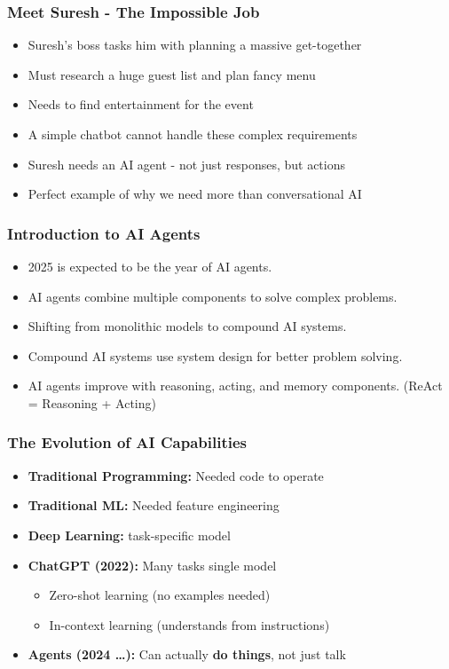 \begin{frame}[fragile]\frametitle{Meet Suresh - The Impossible Job}
      \begin{itemize}
        \item Suresh's boss tasks him with planning a massive get-together
        \item Must research a huge guest list and plan fancy menu
        \item Needs to find entertainment for the event
        \item A simple chatbot cannot handle these complex requirements
        \item Suresh needs an AI agent - not just responses, but actions
        \item Perfect example of why we need more than conversational AI
      \end{itemize}
\end{frame}


\begin{frame}[fragile]\frametitle{Introduction to AI Agents}
    \begin{itemize}
        \item 2025 is expected to be the year of AI agents.
        \item AI agents combine multiple components to solve complex problems.
        \item Shifting from monolithic models to compound AI systems.
        \item Compound AI systems use system design for better problem solving.
        \item AI agents improve with reasoning, acting, and memory components. (ReAct = Reasoning + Acting)
    \end{itemize}
\end{frame}


\begin{frame}[fragile]\frametitle{The Evolution of AI Capabilities}
\begin{itemize}
    \item \textbf{Traditional Programming:} Needed code to operate
    \item \textbf{Traditional ML:} Needed feature engineering
    \item \textbf{Deep Learning:} task-specific model
    \item \textbf{ChatGPT (2022):} Many tasks single model
    \begin{itemize}
        \item Zero-shot learning (no examples needed)
        \item In-context learning (understands from instructions)
    \end{itemize}
    \item \textbf{Agents (2024 \ldots):} Can actually \textbf{do things}, not just talk
\end{itemize}
\end{frame}

